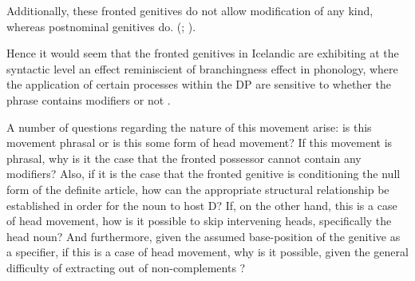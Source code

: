 \documentclass[output=paper,colorlinks,citecolor=brown,
]{langscibook}
\begin{document}
 Additionally, these fronted genitives do not allow modification of any kind, whereas postnominal genitives do. (\citealt{Magnusson:1984ue}; \citealt{OConnor:2013wz}). 

\begin{exe}
	\ex	\citet[101]{Magnusson:1984ue} \label{hardarsoncommons}\vspace{-0.75\baselineskip}
		\begin{xlist}
		\setlength{\columnsep}{-40pt}
		\begin{multicols}{2}
			 \columnbreak
		\end{multicols}
		\end{xlist}
\end{exe}

\noindent Hence it would seem that the fronted genitives in Icelandic are exhibiting at the syntactic level an effect reminiscient of branchingness effect in phonology, where the application of certain processes within the DP are sensitive to whether the phrase contains modifiers or not \citep[for an overview, see, e.g.,][]{Selkirk:2011wv,bonet2019}.

A number of questions regarding the nature of this movement arise: is this movement phrasal or is this some form of head movement? If this movement is phrasal, why is it the case that the fronted possessor cannot contain any modifiers? Also, if it is the case that the fronted genitive is conditioning the null form of the definite article, how can the appropriate structural relationship be established in order for the noun to host D? If, on the other hand, this is a case of head movement, how is it possible to skip intervening heads, specifically the head noun? And furthermore, given the assumed base-position of the genitive as a specifier, if this is a case of head movement, why is it possible, given the general difficulty of extracting out of non-complements \citep[see, e.g.,][]{huang1982}?
\end{document}
